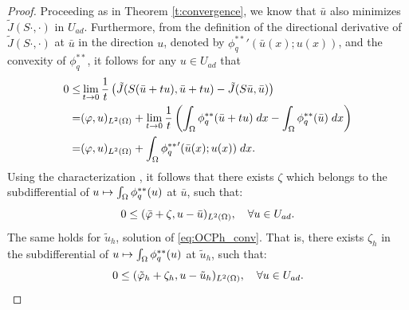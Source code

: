 \begin{proof}
Proceeding as in Theorem \ref{t:convergence}, we know that $\bar u$ also minimizes $\tilde J(S\cdot,\cdot)$ in $U_{ad}$. 
Furthermore, from the definition of the directional derivative of $\tilde J(S\cdot, \cdot)$ at $\bar u$ in the direction $u$, denoted by ${\phi_q^{**}}'(\bar u (x); u(x))$, and the convexity of $\phi_q^{**}$,  it follows for any $u\in U_{ad}$ that 
 \begin{align*} 
 	0 \leq & \lim_{t\to 0}\frac{1}{t}\left(\tilde J(S(\bar u+ tu),\bar u+tu) - \tilde J(S \bar u, \bar u)\right) \nonumber \\
 	  =& ( \varphi, u)_{L^2(\Omega)} + \lim_{t \to 0} \frac{1}{t}\left(\int_{\Omega} \phi_q^{**}( \bar u + t u) \; dx - \int_{\Omega} \phi_q^{**}( \bar u) \;dx\right)  \nonumber \\
 	  =& ( \varphi, u)_{L^2(\Omega)} +   \int_{\Omega} {\phi_q^{**}}'(\bar u (x); u(x)) \; dx.
 \end{align*}
Using the characterization \cite[Proposition 2.39]{barbu2012}, it follows that there exists $\zeta$ which belongs to the subdifferential of   $u \mapsto \int_\Omega \phi_q^{**}(u) $ at $\bar u$,  such that:
 \begin{equation}\label{eq:var_ineq}
 	0 \leq  (\bar\varphi + \zeta , u - \bar u)_{L^2(\Omega)}, \quad \forall u \in U_{ad}.
 \end{equation}
 The same holds for $\tilde u_h$, solution of \eqref{eq:OCPh_conv}. That is, there exists $\zeta_h$ in the subdifferential of   $u \mapsto \int_\Omega \phi^{**}_q(u) $ at $\tilde u_h$, such that:
 \begin{equation}\label{eq:var_ineqh}
 	0 \leq  (\tilde\varphi_h + \zeta_h , u - \tilde u_h)_{L^2(\Omega)}, \quad \forall u \in U_{ad}.
 \end{equation}
 

\end{proof}
